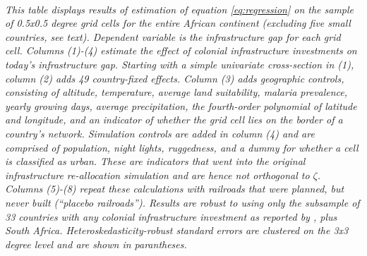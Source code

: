 \documentclass[11pt, oneside]{article}   	%
\begin{document}
\begin{table}[]
\justify
\textit{\\ \footnotesize This table displays results of estimation of equation \eqref{eq:regression} on the sample of 0.5x0.5 degree grid cells for the entire African continent (excluding five small countries, see text). Dependent variable is the infrastructure gap for each grid cell. Columns (1)-(4) estimate the effect of colonial infrastructure investments on today's infrastructure gap. Starting with a simple univariate cross-section in (1), column (2) adds 49 country-fixed effects. Column (3) adds geographic controls, consisting of altitude, temperature, average land suitability, malaria prevalence, yearly growing days, average precipitation, the fourth-order polynomial of latitude and longitude, and an indicator of whether the grid cell lies on the border of a country's network. Simulation controls are added in column (4) and are comprised of population, night lights, ruggedness, and a dummy for whether a cell is classified as urban. These are indicators that went into the original infrastructure re-allocation simulation and are hence not orthogonal to $\zeta$. Columns (5)-(8) repeat these calculations with railroads that were planned, but never built (``placebo railroads''). Results are robust to using only the subsample of 33 countries with any colonial infrastructure investment as reported by \cite{jedwab_permanent_2016}, plus South Africa. Heteroskedasticity-robust standard errors are clustered on the 3x3 degree level and are shown in parantheses.}
\end{table}
\end{document}
